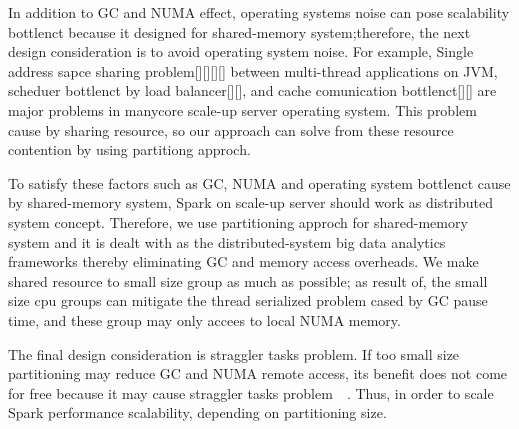 In addition to GC and NUMA effect, operating systems noise can pose scalability
bottlenct because it designed for shared-memory system;therefore, the next
design consideration is to avoid operating system noise.
For example, Single address sapce sharing problem[][][][] between multi-thread
applications on JVM, scheduer bottlenct by load balancer[][], and cache
comunication bottlenct[][] are major problems in manycore scale-up server
operating system.
This problem cause by sharing resource, so our approach can solve from these
resource contention by using partitiong approch.

To satisfy these factors such as GC, NUMA and operating system
bottlenct cause by shared-memory system, Spark on scale-up server should work
as distributed system concept. 
Therefore, we use partitioning approch for shared-memory system and it is dealt
with as the distributed-system big data analytics frameworks thereby eliminating
GC and memory access overheads.
We make shared resource to small size group as much as possible; as result of,
the small size cpu groups can mitigate the thread serialized problem cased by GC
pause time, and these group may only accees to local NUMA memory.



\ifkor
The final design consideration is straggler tasks problem. 
If too small size partitioning may reduce GC and NUMA remote access, its benefit
does not come for free because it may cause straggler tasks
problem~\cite{Ousterhout2015MSP}~\cite{Ren2015HDS}.
Thus, in order to scale Spark performance scalability,  depending on
partitioning size.
\else

